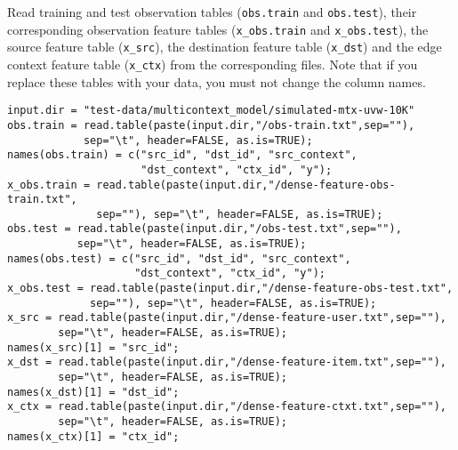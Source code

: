 \documentclass[10pt]{article}
\newcommand{\parahead}[1]{\vspace{0.15in}\noindent{\bf #1:}}
\begin{document}
\parahead{Step 1} 
Read training and test observation tables ({\tt obs.train} and {\tt obs.test}), their corresponding observation feature tables ({\tt x\_obs.train} and {\tt x\_obs.test}), the source feature table ({\tt x\_src}), the destination feature table ({\tt x\_dst}) and the edge context feature table ({\tt x\_ctx}) from the corresponding files.  Note that if you replace these tables with your data, you must not change the column names.
{\small\begin{verbatim}
input.dir = "test-data/multicontext_model/simulated-mtx-uvw-10K"
obs.train = read.table(paste(input.dir,"/obs-train.txt",sep=""), 
            sep="\t", header=FALSE, as.is=TRUE);
names(obs.train) = c("src_id", "dst_id", "src_context", 
                     "dst_context", "ctx_id", "y");
x_obs.train = read.table(paste(input.dir,"/dense-feature-obs-train.txt",
              sep=""), sep="\t", header=FALSE, as.is=TRUE);
obs.test = read.table(paste(input.dir,"/obs-test.txt",sep=""), 
           sep="\t", header=FALSE, as.is=TRUE);
names(obs.test) = c("src_id", "dst_id", "src_context", 
                    "dst_context", "ctx_id", "y");
x_obs.test = read.table(paste(input.dir,"/dense-feature-obs-test.txt",
             sep=""), sep="\t", header=FALSE, as.is=TRUE);
x_src = read.table(paste(input.dir,"/dense-feature-user.txt",sep=""),
        sep="\t", header=FALSE, as.is=TRUE);
names(x_src)[1] = "src_id";
x_dst = read.table(paste(input.dir,"/dense-feature-item.txt",sep=""),
        sep="\t", header=FALSE, as.is=TRUE);
names(x_dst)[1] = "dst_id";
x_ctx = read.table(paste(input.dir,"/dense-feature-ctxt.txt",sep=""),
        sep="\t", header=FALSE, as.is=TRUE);
names(x_ctx)[1] = "ctx_id";
\end{verbatim}}
\end{document}
